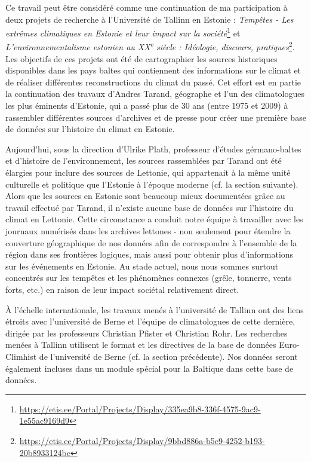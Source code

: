 \documentclass[a4paper,twoside,12pt]{article}
\begin{document}
Ce travail peut être considéré comme une continuation de ma participation à deux projets de recherche à l'Université de Tallinn en Estonie : \textit{Tempêtes - Les extrêmes climatiques en Estonie et leur impact sur la société}\footnote{\url{https://etis.ee/Portal/Projects/Display/335ea9b8-336f-4575-9ac9-1e55ac9169d9}} et \textit{L'environnementalisme estonien au XX\textsuperscript{e} siècle : Idéologie, discours, pratiques}\footnote{\url{https://etis.ee/Portal/Projects/Display/9bbd886a-b5e9-4252-b193-20b8933124bc}}. Les objectifs de ces projets ont été de cartographier les sources historiques disponibles dans les pays baltes qui contiennent des informations sur le climat et de réaliser différentes reconstructions du climat du passé. Cet effort est en partie la continuation des travaux d'Andres Tarand, géographe et l'un des climatologues les plus éminents d'Estonie, qui a passé plus de 30 ans (entre 1975 et 2009) à rassembler différentes sources d'archives et de presse pour créer une première base de données sur l'histoire du climat en Estonie.

Aujourd'hui, sous la direction d'Ulrike Plath, professeur d'études gérmano-baltes et d'histoire de l'environnement, les sources rassemblées par Tarand ont été élargies pour inclure des sources de Lettonie, qui appartenait à la même unité culturelle et politique que l'Estonie à l'époque moderne (cf. la section suivante). Alors que les sources en Estonie sont beaucoup mieux documentées grâce au travail effectué par Tarand, il n'existe aucune base de données sur l'histoire du climat en Lettonie. Cette circonstance a conduit notre équipe à travailler avec les journaux numérisés dans les archives lettones - non seulement pour étendre la couverture géographique de nos données afin de correspondre à l'ensemble de la région dans ses frontières logiques, mais aussi pour obtenir plus d'informations sur les événements en Estonie. Au stade actuel, nous nous sommes surtout concentrés sur les tempêtes et les phénomènes connexes (grêle, tonnerre, vents forts, etc.) en raison de leur impact sociétal relativement direct.

À l'échelle internationale, les travaux menés à l'université de Tallinn ont des liens étroits avec l'université de Berne et l'équipe de climatologues de cette dernière, dirigée par les professeurs Christian Pfister et Christian Rohr. Les recherches menées à Tallinn utilisent le format et les directives de la base de données Euro-Climhist de l'université de Berne (cf. la section précédente). Nos données seront également incluses dans un module spécial pour la Baltique dans cette base de données.
\end{document}
